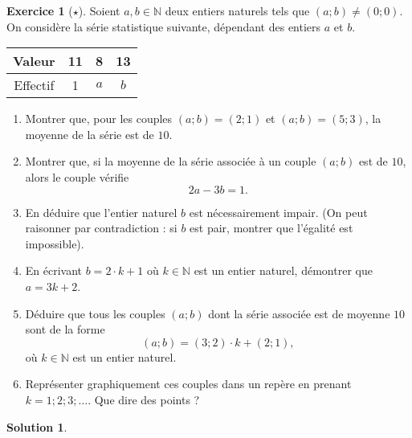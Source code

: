 \documentclass[a4paper, 14pt]{extarticle}
\theoremstyle{plain}
\newtheorem*{sol}{Solution}
\theoremstyle{definition}
\newtheorem{ex}{Exercice}
\newcommand{\N}{\mathbb{N}}
\newcommand{\exe}[2]{
		\begin{ex} #1  \end{ex}
		\begin{sol} #2 \end{sol}
	}
\newcommand{\exe}[2]{
		\begin{ex} #1  \end{ex}
	}
\begin{document}
\exe{[$\star$]

	Soient $a, b \in \N$ deux entiers naturels tels que $(a;b) \neq (0;0)$.
	On considère la série statistique suivante, dépendant des entiers $a$ et $b$.
		\begin{center}
		\begin{tabular}{|c|c|c|c|}\hline
			Valeur   & 11 & 8 & 13 \\ \hline
			Effectif & 1 & $a$ & $b$ \\ \hline
		\end{tabular}
		\end{center}

	\begin{enumerate}
		\item
		Montrer que, pour les couples $(a;b) = (2;1)$ et $(a;b) = (5;3)$, la moyenne de la série est de $10$.
		\item
		Montrer que, si la moyenne de la série associée à un couple $(a;b)$ est de $10$, alors le couple vérifie
			\[ 2a - 3b = 1. \]
		\item
		En déduire que l'entier naturel $b$ est nécessairement impair.
		(On peut raisonner par contradiction : si $b$ est pair, montrer que l'égalité est impossible).
		\item
		En écrivant $b=2\cdot k + 1$ où $k\in\N$ est un entier naturel, démontrer que $a = 3k + 2$. 
		\item
		Déduire que tous les couples $(a;b)$ dont la série associée est de moyenne $10$ sont de la forme
			\[ (a;b) = (3;2)\cdot k + (2;1), \]
		où $k\in\N$ est un entier naturel.
		\item
		Représenter graphiquement ces couples dans un repère en prenant $k=1; 2; 3; \dots$.
		Que dire des points ?
	\end{enumerate}
		
}{}
\end{document}
